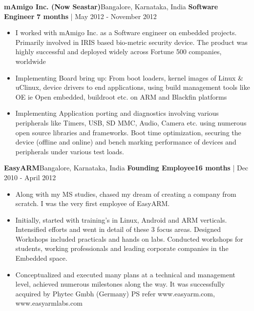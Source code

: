         \vspace{12pt}
    \textbf{mAmigo Inc. (Now Seastar)}\hfill{Bangalore, Karnataka, India}
    \newline
    \textbf{Software Engineer} \hfill{\textbf{7 months} | May 2012 - November 2012}
    \begin{itemize}
     
            \item {I worked with mAmigo Inc. as a Software engineer on embedded projects. Primarily involved in IRIS based bio-metric security device. The product was highly successful and deployed widely across Fortune 500 companies, worldwide}
            \item {Implementing Board bring up: From boot loaders, kernel images of Linux \& uClinux, device drivers to end applications, using build management tools like OE ie Open embedded, buildroot etc. on ARM and Blackfin platforms}
            \item {Implementing Application porting and diagnostics involving various peripherals like Timers, USB, SD MMC, Audio, Camera etc. using numerous open source libraries and frameworks. Boot time optimization, securing the device (offline and online) and bench marking performance of devices and peripherals under various test loads.}
            
    \end{itemize}
    \vspace{12pt}
\textbf{EasyARM}\hfill{Bangalore, Karnataka, India}
\newline
\textbf{Founding Employee}\hfill{\textbf{16 months} | Dec 2010 - April 2012}
\begin{itemize}
            \item {Along with my MS studies, chased my dream of creating a company from scratch. I was the very first employee of EasyARM.} 
                \item{Initially, started with training's in Linux, Android and ARM verticals. Intensified efforts and went in detail of these 3 focus areas. Designed Workshops included practicals and hands on labs. Conducted workshops for students, working professionals and leading corporate companies in the Embedded space.}
                \item {Conceptualized and executed many plans at a technical and management level, achieved numerous milestones along the way. It was successfully acquired by Phytec Gmbh (Germany) PS refer www.easyarm.com, www.easyarmlabs.com}
\end{itemize}


